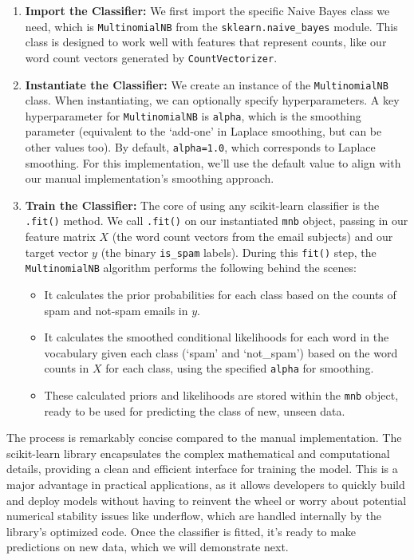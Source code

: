 \documentclass[12pt,letterpaper]{article}
\begin{document}
\begin{enumerate}
    \item \textbf{Import the Classifier:} We first import the specific Naive Bayes class we need, which is \texttt{MultinomialNB} from the \texttt{sklearn.naive\_bayes} module. This class is designed to work well with features that represent counts, like our word count vectors generated by \texttt{CountVectorizer}.

    \item \textbf{Instantiate the Classifier:} We create an instance of the \texttt{MultinomialNB} class. When instantiating, we can optionally specify hyperparameters. A key hyperparameter for \texttt{MultinomialNB} is \texttt{alpha}, which is the smoothing parameter (equivalent to the `add-one' in Laplace smoothing, but can be other values too). By default, \texttt{alpha=1.0}, which corresponds to Laplace smoothing. For this implementation, we'll use the default value to align with our manual implementation's smoothing approach.

    \item \textbf{Train the Classifier:} The core of using any scikit-learn classifier is the \texttt{.fit()} method. We call \texttt{.fit()} on our instantiated \texttt{mnb} object, passing in our feature matrix $X$ (the word count vectors from the email subjects) and our target vector $y$ (the binary \texttt{is\_spam} labels). During this \texttt{fit()} step, the \texttt{MultinomialNB} algorithm performs the following behind the scenes:
    \begin{itemize}
        \item It calculates the prior probabilities for each class based on the counts of spam and not-spam emails in $y$.
        \item It calculates the smoothed conditional likelihoods for each word in the vocabulary given each class (`spam' and `not\_spam') based on the word counts in $X$ for each class, using the specified \texttt{alpha} for smoothing.
        \item These calculated priors and likelihoods are stored within the \texttt{mnb} object, ready to be used for predicting the class of new, unseen data.
    \end{itemize}
\end{enumerate}

The process is remarkably concise compared to the manual implementation. The scikit-learn library encapsulates the complex mathematical and computational details, providing a clean and efficient interface for training the model. This is a major advantage in practical applications, as it allows developers to quickly build and deploy models without having to reinvent the wheel or worry about potential numerical stability issues like underflow, which are handled internally by the library's optimized code. Once the classifier is fitted, it's ready to make predictions on new data, which we will demonstrate next.
\end{document}
